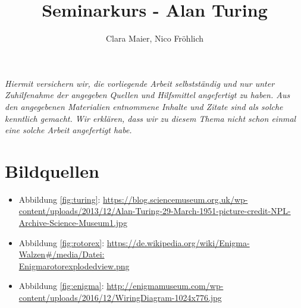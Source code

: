 \documentclass[11pt,a4paper]{article}
\author{Clara Maier, Nico Fröhlich}
\title{Seminarkurs - Alan Turing}
\renewcommand{\figurename}{Abbildung}
\begin{document}
\maketitle
\newpage
\emph{Hiermit versichern wir, die vorliegende Arbeit selbstständig und nur unter Zuhilfenahme der angegeben Quellen und Hilfsmittel angefertigt zu haben. Aus den angegebenen Materialien entnommene Inhalte und Zitate sind als solche kenntlich gemacht. Wir erklären, dass wir zu diesem Thema nicht schon einmal eine solche Arbeit angefertigt habe.}
\newpage

\tableofcontents
\newpage





\section*{Bildquellen}
{\renewcommand\labelitemi{}
\begin{itemize}
\item {\figurename} \ref{fig:turing}: \href{https://blog.sciencemuseum.org.uk/wp-content/uploads/2013/12/Alan-Turing-29-March-1951-picture-credit-NPL-Archive-Science-Museum1.jpg}{https://blog.sciencemuseum.org.uk/wp-content/uploads/2013/12/Alan-Turing-29-March-1951-picture-credit-NPL-Archive-Science-Museum1.jpg}
\item {\figurename} \ref{fig:rotorex}: \href{https://de.wikipedia.org/wiki/Enigma-Walzen#/media/Datei:Enigma_rotor_exploded_view.png}{https://de.wikipedia.org/wiki/Enigma-Walzen\#/media/Datei:\\Enigma\textunderscore rotor\textunderscore exploded\textunderscore view.png}
\item {\figurename} \ref{fig:enigma}: \href{http://enigmamuseum.com/wp-content/uploads/2016/12/WiringDiagram-1024x776.jpg}{http://enigmamuseum.com/wp-content/uploads/2016/12/WiringDiagram-1024x776.jpg}
\end{itemize}
}



\end{document}
